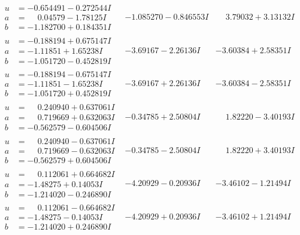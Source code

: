 \documentclass[1p]{elsarticle_modified}
\theoremstyle{definition}
\begin{document}
$$\begin{array}{c|c|c}
\begin{aligned}
u &= -0.654491 - 0.272544 I \\
a &= \phantom{-}0.04579 - 1.78125 I \\
b &= -1.182700 + 0.184351 I\end{aligned}
 & -1.085270 - 0.846553 I & \phantom{-}3.79032 + 3.13132 I \\ \hline\begin{aligned}
u &= -0.188194 + 0.675147 I \\
a &= -1.11851 + 1.65238 I \\
b &= -1.051720 - 0.452819 I\end{aligned}
 & -3.69167 - 2.26136 I & -3.60384 + 2.58351 I \\ \hline\begin{aligned}
u &= -0.188194 - 0.675147 I \\
a &= -1.11851 - 1.65238 I \\
b &= -1.051720 + 0.452819 I\end{aligned}
 & -3.69167 + 2.26136 I & -3.60384 - 2.58351 I \\ \hline\begin{aligned}
u &= \phantom{-}0.240940 + 0.637061 I \\
a &= \phantom{-}0.719669 + 0.632063 I \\
b &= -0.562579 - 0.604506 I\end{aligned}
 & -0.34785 + 2.50804 I & \phantom{-}1.82220 - 3.40193 I \\ \hline\begin{aligned}
u &= \phantom{-}0.240940 - 0.637061 I \\
a &= \phantom{-}0.719669 - 0.632063 I \\
b &= -0.562579 + 0.604506 I\end{aligned}
 & -0.34785 - 2.50804 I & \phantom{-}1.82220 + 3.40193 I \\ \hline\begin{aligned}
u &= \phantom{-}0.112061 + 0.664682 I \\
a &= -1.48275 + 0.14053 I \\
b &= -1.214020 - 0.246890 I\end{aligned}
 & -4.20929 - 0.20936 I & -3.46102 - 1.21494 I \\ \hline\begin{aligned}
u &= \phantom{-}0.112061 - 0.664682 I \\
a &= -1.48275 - 0.14053 I \\
b &= -1.214020 + 0.246890 I\end{aligned}
 & -4.20929 + 0.20936 I & -3.46102 + 1.21494 I\\

\end{array}$$
\end{document}
